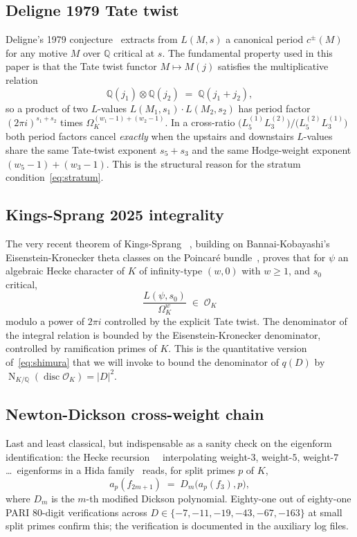 \documentclass[11pt]{amsart}
\theoremstyle{definition}
\theoremstyle{remark}
\DeclareMathOperator{\Nm}{N}
\DeclareMathOperator{\disc}{disc}
\newcommand{\Q}{\mathbb{Q}}
\newcommand{\OK}{\mathcal{O}_K}
\begin{document}
\subsection{Deligne 1979 Tate twist}\label{ss:deligne-tate}
Deligne's 1979 conjecture~\cite{Deligne1979} extracts from $L(M, s)$
a canonical period $c^{\pm}(M)$ for any motive $M$ over $\Q$ critical
at $s$. The fundamental property used in this paper is that the
Tate twist functor $M \mapsto M(j)$ satisfies the multiplicative
relation
\begin{equation}\label{eq:tate-twist}
\Q(j_1) \otimes \Q(j_2) \; = \; \Q(j_1 + j_2),
\end{equation}
so a product of two $L$-values $L(M_1, s_1) \cdot L(M_2, s_2)$ has
period factor $(2\pi i)^{s_1 + s_2}$ times $\Omega_{K}^{(w_1 - 1) +
(w_2 - 1)}$. In a cross-ratio
$\bigl(L_5^{(1)} L_3^{(2)}\bigr) / \bigl(L_5^{(2)} L_3^{(1)}\bigr)$
both period factors cancel \emph{exactly} when the upstairs and
downstairs $L$-values share the same Tate-twist
exponent $s_5 + s_3$ and the same Hodge-weight exponent
$(w_5 - 1) + (w_3 - 1)$. This is the structural reason for the
stratum condition~\eqref{eq:stratum}.

\subsection{Kings-Sprang 2025 integrality}\label{ss:kings-sprang}
The very recent theorem of Kings-Sprang~\cite{KingsSprang2025}
\cite{KingsSprangArxiv}, building on Bannai-Kobayashi's
Eisenstein-Kronecker theta classes on the Poincar\'e
bundle~\cite{BannaiKobayashi2010}, proves that for $\psi$ an algebraic
Hecke character of $K$ of infinity-type $(w, 0)$ with $w \geq 1$, and
$s_0$ critical,
\begin{equation}\label{eq:kings-sprang}
\frac{L(\psi, s_0)}{\Omega_K^{w}} \; \in \; \OK
\end{equation}
modulo a power of $2\pi i$ controlled by the explicit Tate twist. The
denominator of the integral relation is bounded by the Eisenstein-Kronecker
denominator, controlled by ramification primes of $K$. This is the
quantitative version of~\eqref{eq:shimura} that we will invoke to bound
the denominator of $q(D)$ by $\Nm_{K/\Q}(\disc \OK) = |D|^2$.

\subsection{Newton-Dickson cross-weight chain}
\label{ss:newton-dickson}
Last and least classical, but indispensable as a sanity check on
the eigenform identification: the Hecke
recursion~\cite{Hecke1937}~\cite{Schutt2008} interpolating
weight-$3$, weight-$5$, weight-$7$ \dots\ eigenforms in a Hida
family~\cite{Hida1986} reads, for split primes $p$ of $K$,
\begin{equation}\label{eq:newton-dickson}
a_p(f_{2m+1}) \; = \; D_m\bigl(a_p(f_3), p\bigr),
\end{equation}
where $D_m$ is the $m$-th modified Dickson polynomial. Eighty-one out
of eighty-one PARI 80-digit verifications across $D \in \{-7, -11,
-19, -43, -67, -163\}$ at small split primes confirm this; the
verification is documented in the auxiliary log files.
\end{document}
